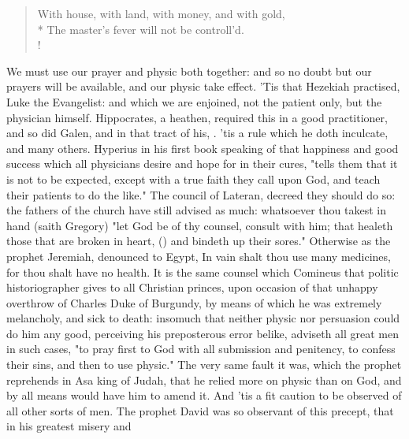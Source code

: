 {\begin{verse}%
With house, with land, with money, and with gold,\\*
The master's fever will not be controll'd.\\!
\end{verse}%

We must use our prayer and physic both together: and so no doubt but our
prayers will be available, and our physic take effect. 'Tis that Hezekiah
practised,  Luke the Evangelist: and which we are
enjoined,  not the patient only, but the physician
himself. Hippocrates, a heathen, required this in a good practitioner, and so
did Galen, 
and in that tract of his, . 'tis a rule which he doth inculcate, and many
others. Hyperius in his first book  speaking of that happiness and good success which all physicians desire
and hope for in their cures, "tells them that it is not to
be expected, except with a true faith they call upon God, and teach their
patients to do the like." The council of Lateran,  decreed they should do so: the fathers of the church have still advised
as much: whatsoever thou takest in hand (saith Gregory)
"let God be of thy counsel, consult with him; that healeth those that are
broken in heart, () and bindeth up their sores."
Otherwise as the prophet Jeremiah,  denounced to
Egypt, In vain shalt thou use many medicines, for thou shalt have no health. It
is the same counsel which Comineus that politic
historiographer gives to all Christian princes, upon occasion of that unhappy
overthrow of Charles Duke of Burgundy, by means of which he was extremely
melancholy, and sick to death: insomuch that neither physic nor persuasion
could do him any good, perceiving his preposterous error belike, adviseth all
great men in such cases, "to pray first to God with all
submission and penitency, to confess their sins, and then to use physic." The
very same fault it was, which the prophet reprehends in Asa king of Judah, that
he relied more on physic than on God, and by all means would have him to amend
it. And 'tis a fit caution to be observed of all other sorts of men. The
prophet David was so observant of this precept, that in his greatest misery and
}
